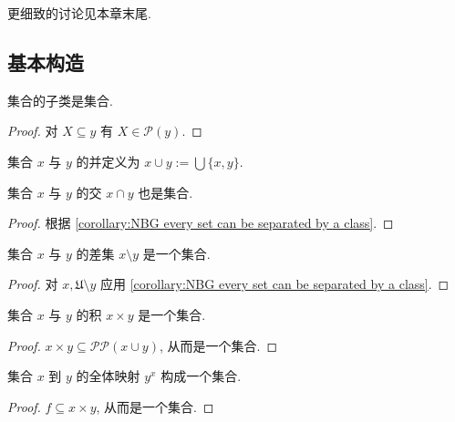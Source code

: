 更细致的讨论见本章末尾.

\subsection{基本构造}

\begin{corollary}
    集合的子类是集合.

    \begin{proof}
        对 \(X \subseteq y\) 有 \(X \in \mathcal{P} (y)\).
    \end{proof}
\end{corollary}

\begin{definition}
    \label {definition:union of two sets}
    集合 \(x\) 与 \(y\) 的并定义为 \(x \cup y := \bigcup \{x,y\}\).
\end{definition}

\begin{definition}
    \label {definition:intersection of two sets}
    集合 \(x\) 与 \(y\) 的交 \(x \cap y\) 也是集合.

    \begin{proof}
        根据 \ref{corollary:NBG every set can be separated by a class}.
    \end{proof}
\end{definition}

\begin{definition}
    \label {definition:difference of two sets}
    集合 \(x\) 与 \(y\) 的差集 \(x \setminus y\) 是一个集合.

    \begin{proof}
        对 \(x, \mathfrak{U} \setminus y\) 应用 \ref{corollary:NBG every set can be separated by a class}.
    \end{proof}
\end{definition}

\begin{definition}
    \label {definition:product of two sets}
    集合 \(x\) 与 \(y\) 的积 \(x \times y\) 是一个集合.

    \begin{proof}
        \(x \times y \subseteq \mathcal{P} \mathcal{P} (x \cup y)\), 从而是一个集合.
    \end{proof}
\end{definition}

\begin{definition}
    \label {definition:function from a set to a set}
    集合 \(x\) 到 \(y\) 的全体映射 \(y^x\) 构成一个集合.

    \begin{proof}
        \(f \subseteq x \times y\), 从而是一个集合.
    \end{proof}
\end{definition}

